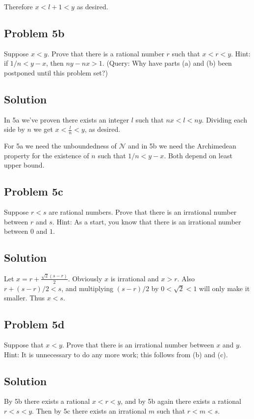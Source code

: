 Therefore $x<l+1<y$ as desired.

\subsection*{Problem 5b}
Suppose $x<y$. Prove that there is a rational number $r$ such that
$x<r<y$. Hint: if $1/n<y-x$, then $ny-nx>1$. (Query: Why have parts
(a) and (b) been postponed until this problem set?)

\subsection*{Solution}
In 5a we've proven there exists an integer $l$ such that $nx<l<ny$.
Dividing each side by $n$ we get $x<\frac{l}{n}<y$, as desired.

\vs

For 5a we need the unboundedness of $\mathcal{N}$ and in 5b we need the
Archimedean property for the existence of $n$ such that $1/n<y-x$.
Both depend on least upper bound.

\subsection*{Problem 5c}
Suppose $r<s$ are rational numbers. Prove that there is an irrational
number between $r$ and $s$. Hint: As a start, you know that there is
an irrational number between $0$ and $1$.

\subsection*{Solution}
Let $x=r+\frac{\sqrt{2}(s-r)}{2}$. Obviously $x$ is irrational and
$x>r$. Also $r+(s-r)/2<s$, and multiplying $(s-r)/2$ by $0<\sqrt{2}<1$
will only make it smaller. Thus $x<s$.

\subsection*{Problem 5d}
Suppose that $x<y$. Prove that there is an irrational number between
$x$ and $y$. Hint: It is unnecessary to do any more work; this follows
from (b) and (c).

\subsection*{Solution}
By 5b there exists a rational $x<r<y$, and by 5b again there exists a
rational $r<s<y$. Then by 5c there exists an irrational $m$ such that
$r<m<s$.

